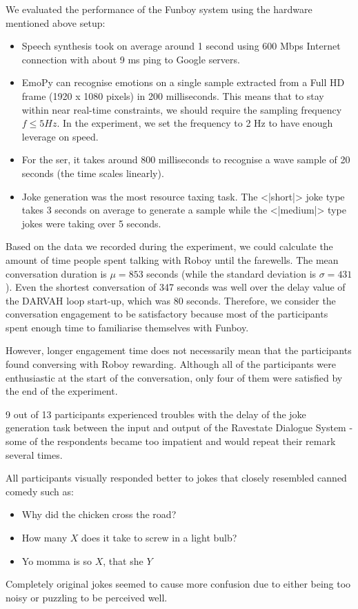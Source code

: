 We evaluated the performance of the Funboy system using the hardware mentioned above setup:
\begin{itemize}
    \item Speech synthesis took on average around 1 second using 600 Mbps Internet connection with about 9 ms ping to Google servers.
    \item EmoPy can recognise emotions on a single sample extracted from a Full HD frame (1920 x 1080 pixels) in 200 milliseconds. This means that to stay within near real-time constraints, we should require the sampling frequency \( f \leq 5 Hz\). In the experiment, we set the frequency to 2 Hz to have enough leverage on speed.
    \item For the \acrshort{ser}, it takes around 800 milliseconds to recognise a wave sample of 20 seconds (the time scales linearly).
    \item Joke generation was the most resource taxing task. The <|short|> joke type takes 3 seconds on average to generate a sample while the <|medium|> type jokes were taking over 5 seconds. 
\end{itemize}

Based on the data we recorded during the experiment, we could calculate the amount of time people spent talking with Roboy until the farewells. The mean conversation duration is \( \mu = 853\) seconds (while the standard deviation is \( \sigma = 431\)). Even the shortest conversation of 347 seconds was well over the delay value of the DARVAH loop start-up, which was 80 seconds. Therefore, we consider the conversation engagement to be satisfactory because most of the participants spent enough time to familiarise themselves with Funboy.

However, longer engagement time does not necessarily mean that the participants found conversing with Roboy rewarding. Although all of the participants were enthusiastic at the start of the conversation, only four of them were satisfied by the end of the experiment. 

9 out of 13 participants experienced troubles with the delay of the joke generation task between the input and output of the Ravestate Dialogue System - some of the respondents became too impatient and would repeat their remark several times.

All participants visually responded better to jokes that closely resembled canned comedy such as:
\begin{itemize}
    \item Why did the chicken cross the road?
    \item How many \( X\) does it take to screw in a light bulb?
    \item Yo momma is so \( X\), that she \( Y\)
\end{itemize}
Completely original jokes seemed to cause more confusion due to either being too noisy or puzzling to be perceived well.

